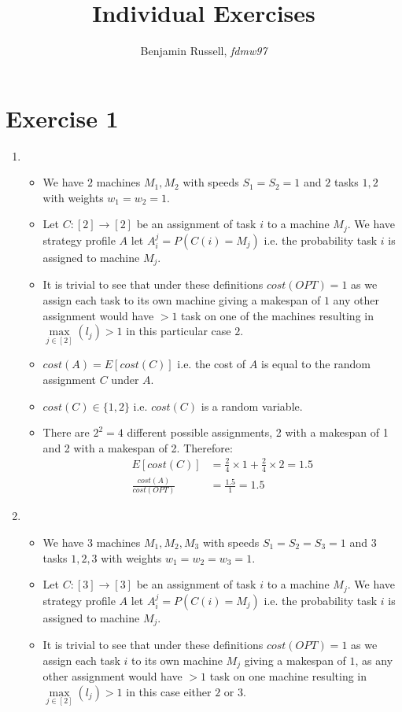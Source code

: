 \documentclass[]{article}
\title{Individual Exercises}
\author{Benjamin Russell, \textit{fdmw97}}
\begin{document}
\maketitle

\section*{Exercise 1}
\begin{enumerate}
	\item ~
	\begin{itemize}
		\item
		We have $2$ machines $M_1, M_2$ with speeds $S_1=S_2=1$ and $2$ tasks $1,2$ with weights $w_1=w_2=1$.
		\item
		Let $C:[2]\rightarrow[2]$ be an assignment of task $i$ to a machine $M_j$. We have strategy profile $A$ let $A_i^j=P(C(i)=M_j)$ i.e. the probability task $i$ is assigned to machine $M_j$.
		\item
		It is trivial to see that under these definitions $cost(OPT)=1$ as we assign each task to its own machine giving a makespan of $1$ any other assignment would have $>1$ task on one of the machines resulting in $\max\limits_{j\in[2]}(l_j)>1$ in this particular case $2$.
		\item
		$cost(A)=E[cost(C)]$ i.e. the cost of $A$ is equal to the random assignment $C$ under $A$.
		\item
		$cost(C)\in\{1,2\}$ i.e. $cost(C)$ is a random variable.
		\item
		There are $2^2=4$ different possible assignments, 2 with a makespan of 1 and 2 with a makespan of 2. Therefore:
		\begin{align*}
						E[cost(C)]&=\frac{2}{4}\times1+\frac{2}{4}\times2=1.5 \\
						\frac{cost(A)}{cost(OPT)}&=\frac{1.5}{1}=1.5
		\end{align*}
	\end{itemize}
	\item~
	\begin{itemize}
		\item
		We have 3 machines $M_1,M_2,M_3$ with speeds $S_1=S_2=S_3=1$ and $3$ tasks $1,2,3$ with weights $w_1=w_2=w_3=1$.
		\item
		Let $C:[3]\rightarrow[3]$ be an assignment of task $i$ to a machine $M_j$. We have strategy profile $A$ let $A_i^j=P(C(i)=M_j)$ i.e. the probability task $i$ is assigned to machine $M_j$.
		\item
		It is trivial to see that under these definitions $cost(OPT)=1$ as we assign each task $i$ to its own machine $M_j$ giving a makespan of $1$, as any other assignment would have $>1$ task on one machine resulting in $\max\limits_{j\in[2]}(l_j)>1$ in this case either $2$ or $3$.

\end{itemize}
\end{enumerate}
\end{document}

